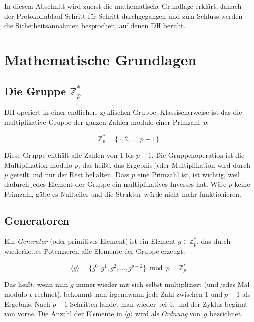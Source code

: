 \documentclass[conference]{IEEEtran}
\begin{document}
In diesem Abschnitt wird zuerst die mathematische Grundlage erklärt,
danach der Protokollablauf Schritt für Schritt durchgegangen und
zum Schluss werden die Sicherheitsannahmen besprochen, auf denen DH
beruht.

\section{Mathematische Grundlagen}

\subsection{Die Gruppe $\mathbb{Z}_p^*$}

DH operiert in einer endlichen, zyklischen Gruppe. Klassischerweise
ist das die multiplikative Gruppe der ganzen Zahlen modulo einer
Primzahl~$p$:

\begin{equation}
    \mathbb{Z}_p^* = \{1, 2, \ldots, p-1\}
\end{equation}

Diese Gruppe enthält alle Zahlen von 1 bis $p-1$. Die Gruppenoperation
ist die Multiplikation modulo $p$, das heißt, das Ergebnis jeder
Multiplikation wird durch $p$ geteilt und nur der Rest behalten.
Dass $p$ eine Primzahl ist, ist wichtig, weil dadurch jedes Element
der Gruppe ein multiplikatives Inverses hat. Wäre $p$ keine Primzahl,
gäbe es Nullteiler und die Struktur würde nicht mehr funktionieren.

\subsection{Generatoren}

Ein \emph{Generator} (oder primitives Element) ist ein Element $g \in
\mathbb{Z}_p^*$, das durch wiederholtes Potenzieren alle Elemente der
Gruppe erzeugt:

\begin{equation}
    \langle g \rangle = \{g^0, g^1, g^2, \ldots, g^{p-2}\} \bmod p
    = \mathbb{Z}_p^*
\end{equation}

Das heißt, wenn man $g$ immer wieder mit sich selbst multipliziert
(und jedes Mal modulo $p$ rechnet), bekommt man irgendwann jede Zahl
zwischen 1 und $p-1$ als Ergebnis. Nach $p-1$ Schritten landet man
wieder bei 1, und der Zyklus beginnt von vorne. Die Anzahl der
Elemente in $\langle g \rangle$ wird als \emph{Ordnung} von~$g$
bezeichnet.
\end{document}
